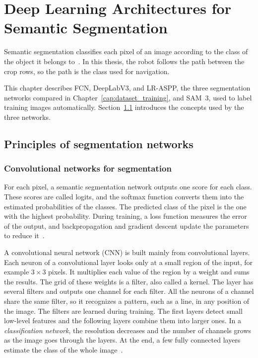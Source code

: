 \chapter{Deep Learning Architectures for Semantic Segmentation}
\label{cap:architectures}

Semantic segmentation classifies each pixel of an image according to the class of the object it belongs to~\cite{geron2026handson}. In this thesis, the robot follows the path between the crop rows, so the path is the class used for navigation.

This chapter describes FCN, DeepLabV3, and LR-ASPP, the three segmentation networks compared in Chapter~\ref{cap:dataset_training}, and SAM~3, used to label training images automatically. Section~\ref{sec:seg_formulation} introduces the concepts used by the three networks.

\section{Principles of segmentation networks}
\label{sec:seg_formulation}

\subsection{Convolutional networks for segmentation}
\label{subsec:seg_networks}

For each pixel, a semantic segmentation network outputs one score for each class. These scores are called logits, and the softmax function converts them into the estimated probabilities of the classes. The predicted class of the pixel is the one with the highest probability. During training, a loss function measures the error of the output, and backpropagation and gradient descent update the parameters to reduce it~\cite{geron2026handson}.

A convolutional neural network (CNN) is built mainly from convolutional layers. Each neuron of a convolutional layer looks only at a small region of the input, for example $3\times3$ pixels. It multiplies each value of the region by a weight and sums the results. The grid of these weights is a filter, also called a kernel. The layer has several filters and outputs one channel for each filter. All the neurons of a channel share the same filter, so it recognizes a pattern, such as a line, in any position of the image. The filters are learned during training. The first layers detect small low-level features and the following layers combine them into larger ones. In a \textit{classification network}, the resolution decreases and the number of channels grows as the image goes through the layers. At the end, a few fully connected layers estimate the class of the whole image~\cite{geron2026handson}.

